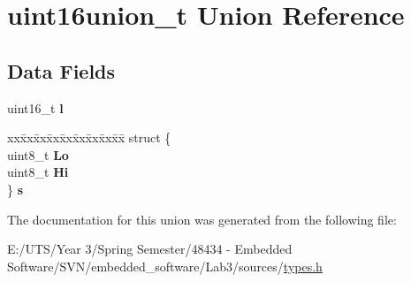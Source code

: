 \hypertarget{unionuint16union__t}{}\section{uint16union\+\_\+t Union Reference}
\label{unionuint16union__t}
\subsection*{Data Fields}
\begin{DoxyCompactItemize}
\item 
\hypertarget{unionuint16union__t_a99ee3a3f73300849c180c387230c7caa}{}uint16\+\_\+t {\bfseries l}\label{unionuint16union__t_a99ee3a3f73300849c180c387230c7caa}

\item 
\hypertarget{unionuint16union__t_a1cb156304a2b88c27621570c9a95d016}{}\begin{tabbing}
xx\=xx\=xx\=xx\=xx\=xx\=xx\=xx\=xx\=\kill
struct \{\\
\>uint8\_t {\bfseries Lo}\\
\>uint8\_t {\bfseries Hi}\\
\} {\bfseries s}\label{unionuint16union__t_a1cb156304a2b88c27621570c9a95d016}
\\

\end{tabbing}\end{DoxyCompactItemize}


The documentation for this union was generated from the following file\+:\begin{DoxyCompactItemize}
\item 
E\+:/\+U\+T\+S/\+Year 3/\+Spring Semester/48434 -\/ Embedded Software/\+S\+V\+N/embedded\+\_\+software/\+Lab3/sources/\hyperlink{types_8h}{types.\+h}\end{DoxyCompactItemize}
